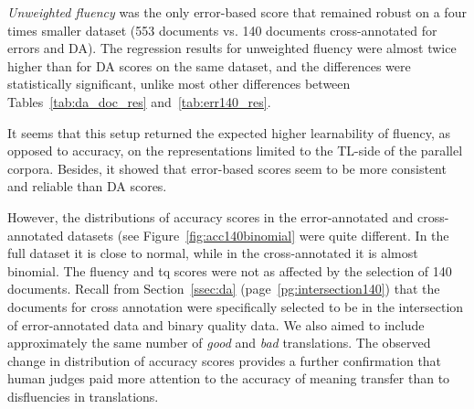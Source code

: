 \textit{Unweighted fluency} was the only error-based score that remained robust on a four times smaller dataset (553 documents vs. 140 documents cross-annotated for errors and DA). The regression results for unweighted fluency were almost twice higher than for DA scores on the same dataset, and the differences were statistically significant, unlike most other differences between Tables~\ref{tab:da_doc_res} and~\ref{tab:err140_res}.

It seems that this setup returned the expected higher learnability of fluency, as opposed to accuracy, on the representations limited to the TL-side of the parallel corpora. Besides, it showed that error-based scores seem to be more consistent and reliable than DA scores. %
 
However, the distributions of accuracy scores in the error-annotated and cross-annotated datasets (see Figure~\ref{fig:acc140binomial} were quite different. In the full dataset it is close to normal, while in the cross-annotated it is almost binomial. The fluency and tq scores were not as affected by the selection of 140 documents. Recall from Section~\ref{ssec:da} (page~\ref{pg:intersection140}) that the documents for cross annotation were specifically selected to be in the intersection of error-annotated data and binary quality data. We also aimed to include approximately the same number of \textit{good} and \textit{bad} translations. The observed change in distribution of accuracy scores provides a further confirmation that human judges paid more attention to the accuracy of meaning transfer than to disfluencies in translations. 

